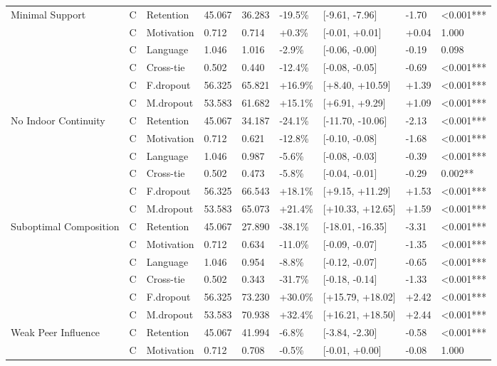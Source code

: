 \begin{longtable}[t]{lllllllll}
\endfoot
\bottomrule
\endlastfoot
Minimal Support & C & Retention & 45.067 & 36.283 & -19.5\% & [-9.61, -7.96] & -1.70 & <0.001***\\
  & C & Motivation & 0.712 & 0.714 & +0.3\% & [-0.01, +0.01] & +0.04 & 1.000\\
  & C & Language & 1.046 & 1.016 & -2.9\% & [-0.06, -0.00] & -0.19 & 0.098\\
  & C & Cross-tie & 0.502 & 0.440 & -12.4\% & [-0.08, -0.05] & -0.69 & <0.001***\\
  & C & F.dropout & 56.325 & 65.821 & +16.9\% & [+8.40, +10.59] & +1.39 & <0.001***\\
  & C & M.dropout & 53.583 & 61.682 & +15.1\% & [+6.91, +9.29] & +1.09 & <0.001***\\
\midrule
No Indoor Continuity & C & Retention & 45.067 & 34.187 & -24.1\% & [-11.70, -10.06] & -2.13 & <0.001***\\
  & C & Motivation & 0.712 & 0.621 & -12.8\% & [-0.10, -0.08] & -1.68 & <0.001***\\
  & C & Language & 1.046 & 0.987 & -5.6\% & [-0.08, -0.03] & -0.39 & <0.001***\\
  & C & Cross-tie & 0.502 & 0.473 & -5.8\% & [-0.04, -0.01] & -0.29 & 0.002**\\
  & C & F.dropout & 56.325 & 66.543 & +18.1\% & [+9.15, +11.29] & +1.53 & <0.001***\\
  & C & M.dropout & 53.583 & 65.073 & +21.4\% & [+10.33, +12.65] & +1.59 & <0.001***\\
\midrule
Suboptimal Composition & C & Retention & 45.067 & 27.890 & -38.1\% & [-18.01, -16.35] & -3.31 & <0.001***\\
  & C & Motivation & 0.712 & 0.634 & -11.0\% & [-0.09, -0.07] & -1.35 & <0.001***\\
  & C & Language & 1.046 & 0.954 & -8.8\% & [-0.12, -0.07] & -0.65 & <0.001***\\
  & C & Cross-tie & 0.502 & 0.343 & -31.7\% & [-0.18, -0.14] & -1.33 & <0.001***\\
  & C & F.dropout & 56.325 & 73.230 & +30.0\% & [+15.79, +18.02] & +2.42 & <0.001***\\
  & C & M.dropout & 53.583 & 70.938 & +32.4\% & [+16.21, +18.50] & +2.44 & <0.001***\\
\midrule
Weak Peer Influence & C & Retention & 45.067 & 41.994 & -6.8\% & [-3.84, -2.30] & -0.58 & <0.001***\\
  & C & Motivation & 0.712 & 0.708 & -0.5\% & [-0.01, +0.00] & -0.08 & 1.000\\

\end{longtable}

